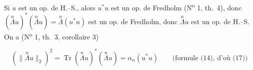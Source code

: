 
Si $u$ est un op. de H.--S., alors $u^*u$ est un op. de Fredholm (N\textsuperscript{o} 1, th.~4), donc $(\overset{n}{\Lambda}u)^*(\overset{n}{\Lambda}u)=\overset{n}{\Lambda}(u^*u)$ est un op. de Fredholm,  donc $\overset{n}{\Lambda}u$ est un op. de H.--S. On a (N\textsuperscript{o} 1, th.~3, corollaire 3)

\[
(\lVert\overset{n}{\Lambda}u\rVert_2)^2=\operatorname{Tr}(\overset{n}{\Lambda}u)^*(\overset{n}{\Lambda}u)=\alpha_n(u^*u)\qquad\text{(formule (14), d'où (17))}
\]
{\reversemarginpar{}}
